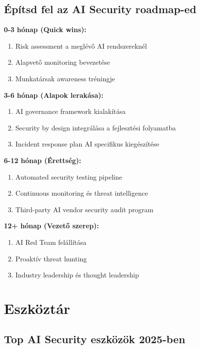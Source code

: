 \documentclass{../templates/magazine}
\begin{document}
\subsection{Építsd fel az AI Security roadmap-ed}

\textbf{0-3 hónap (Quick wins):}
\begin{enumerate}
    \item Risk assessment a meglévő AI rendszereknél
    \item Alapvető monitoring bevezetése
    \item Munkatársak awareness tréningje
\end{enumerate}

\textbf{3-6 hónap (Alapok lerakása):}
\begin{enumerate}
    \item AI governance framework kialakítása
    \item Security by design integrálása a fejlesztési folyamatba
    \item Incident response plan AI specifikus kiegészítése
\end{enumerate}

\textbf{6-12 hónap (Érettség):}
\begin{enumerate}
    \item Automated security testing pipeline
    \item Continuous monitoring és threat intelligence
    \item Third-party AI vendor security audit program
\end{enumerate}

\textbf{12+ hónap (Vezető szerep):}
\begin{enumerate}
    \item AI Red Team felállítása
    \item Proaktív threat hunting
    \item Industry leadership és thought leadership
\end{enumerate}

\newpage

\section{Eszköztár}

\subsection{Top AI Security eszközök 2025-ben}
\end{document}
